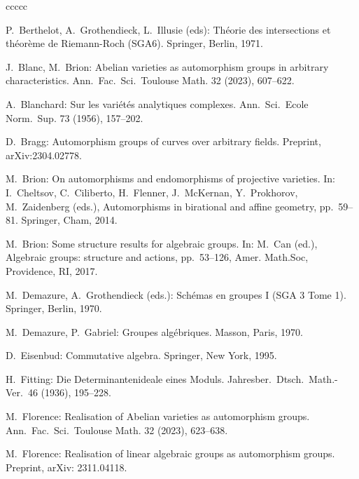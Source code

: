 \begin{thebibliography}{ccccc}


P.\ Berthelot, A.\ Grothendieck, L.\ Illusie (eds):
Th\'eorie des intersections et th\'eor\`eme de
Riemann-Roch (SGA6).
Springer, Berlin, 1971. 

J.\ Blanc, M.\ Brion:
Abelian varieties as automorphism groups in arbitrary characteristics. 
Ann.\ Fac.\ Sci.\ Toulouse Math. 32 (2023), 607--622.

A.\ Blanchard:
Sur les vari\'et\'es analytiques complexes.  
Ann.\ Sci.\ Ecole Norm.\ Sup. 73 (1956), 157--202. 

D.\ Bragg:
Automorphism groups of curves over arbitrary fields.
Preprint,  arXiv:2304.02778.

M.\ Brion:
On automorphisms and endomorphisms of projective varieties.
In:
I.\ Cheltsov, C.\ Ciliberto, H.\ Flenner, J.\ McKernan, Y.\ Prokhorov, M.\ Zaidenberg (eds.),
Automorphisms in birational and affine geometry, 
pp.\ 59--81.
Springer, Cham, 2014. 

M.\ Brion:
Some structure results for algebraic groups.
In: 
M.\ Can (ed.), 
Algebraic groups: structure and actions,
pp.\ 53--126,
Amer. Math.Soc, Providence, RI, 2017.

M.\ Demazure, A.\ Grothendieck (eds.):
Sch\'emas en groupes I (SGA 3 Tome 1).
Springer, Berlin, 1970.

M.\ Demazure, P.\ Gabriel:
Groupes alg\'ebriques.
Masson, Paris, 1970.

D.\ Eisenbud: 
Commutative algebra.  
Springer, New York, 1995.

H.\ Fitting:
Die Determinantenideale eines Moduls.  
Jahresber.\ Dtsch.\ Math.-Ver.\ 46 (1936), 195--228. 

M.\ Florence:
Realisation of Abelian varieties as automorphism groups.
Ann.\ Fac.\ Sci.\ Toulouse Math. 32 (2023), 623--638.

M.\ Florence:
Realisation of linear algebraic groups as automorphism groups.
Preprint, arXiv: 2311.04118.



\end{thebibliography}
